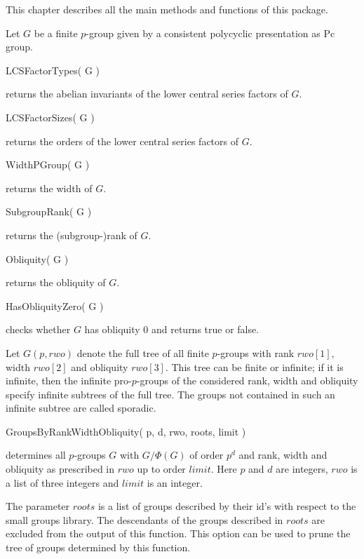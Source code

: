 

This chapter describes all the main methods and functions of this
package. 


Let $G$ be a finite $p$-group given by a consistent polycyclic 
presentation as Pc group.

\> LCSFactorTypes( G )

returns the abelian invariants of the lower central series factors of $G$.

\> LCSFactorSizes( G )

returns the orders of the lower central series factors of $G$.

\> WidthPGroup( G )

returns the width of $G$.

\> SubgroupRank( G )

returns the (subgroup-)rank of $G$.

\> Obliquity( G )

returns the obliquity of $G$.

\> HasObliquityZero( G )

checks whether $G$ has obliquity 0 and returns true or false.


Let $G(p,rwo)$ denote the full tree of all finite $p$-groups with
rank $rwo[1]$, width $rwo[2]$ and obliquity $rwo[3]$. This tree can be
finite or infinite; if it is infinite, then the infinite
pro-$p$-groups of the considered rank, width and obliquity specify
infinite subtrees of the full tree. The groups not contained in such
an infinite subtree are called sporadic.

\> GroupsByRankWidthObliquity( p, d, rwo, roots, limit )

determines all $p$-groups $G$ with $G/\Phi(G)$ of order $p^d$ and
rank, width and obliquity as prescribed in $rwo$ up to order $limit$.
Here $p$ and $d$ are integers, $rwo$ is a list of three integers and
$limit$ is an integer. 

The parameter $roots$ is a list of groups described by their id's 
with respect to the small groups library. The descendants of the 
groups described in $roots$ are excluded from the output of this 
function. This option can be used to prune the tree of groups 
determined by this function.

